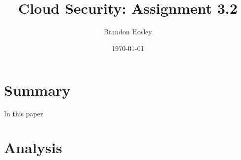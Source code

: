 \documentclass[]{article}
\title{Cloud Security: Assignment 3.2}
\author{Brandon Hosley}
\date{\today}
\begin{document}
	\maketitle
	
\section{Summary} 

In this paper\cite{Mirai2017} 

\section{Analysis}


\clearpage


\end{document}

